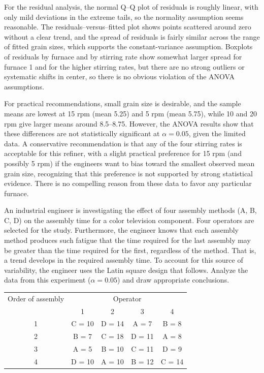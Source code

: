 \documentclass[answers,12pt,addpoints]{exam}
\begin{document}
\begin{questions}
\begin{solution}
For the residual analysis, the normal Q–Q plot of residuals is roughly linear, with only mild deviations in the extreme tails, so the normality assumption seems reasonable. The residuals–versus–fitted plot shows points scattered around zero without a clear trend, and the spread of residuals is fairly similar across the range of fitted grain sizes, which supports the constant-variance assumption. Boxplots of residuals by furnace and by stirring rate show somewhat larger spread for furnace 1 and for the higher stirring rates, but there are no strong outliers or systematic shifts in center, so there is no obvious violation of the ANOVA assumptions.

For practical recommendations, small grain size is desirable, and the sample means are lowest at 15 rpm (mean 5.25) and 5 rpm (mean 5.75), while 10 and 20 rpm give larger means around 8.5–8.75. However, the ANOVA results show that these differences are not statistically significant at $\alpha = 0.05$, given the limited data. A conservative recommendation is that any of the four stirring rates is acceptable for this refiner, with a slight practical preference for 15 rpm (and possibly 5 rpm) if the engineers want to bias toward the smallest observed mean grain size, recognizing that this preference is not supported by strong statistical evidence. There is no compelling reason from these data to favor any particular furnace.
\end{solution}

 An industrial engineer is investigating the effect of four assembly methods (A, B, C, D) on the assembly time for a color television component. Four operators are selected for the study. Furthermore, the engineer knows that each assembly method produces such fatigue that the time required for the last assembly may be greater than the time required for the first, regardless of the method. That is, a trend develops in the required assembly time. To account for this source of variability, the engineer uses the Latin square design that follows. Analyze the data from this experiment ($\alpha = 0.05$) and draw appropriate conclusions.

\begin{center}
\begin{tabular}{c|cccc}
\hline
Order of assembly & \multicolumn{4}{c}{Operator} \\
 & 1 & 2 & 3 & 4 \\
\hline
1 & C = 10 & D = 14 & A = 7 & B = 8 \\
2 & B = 7  & C = 18 & D = 11 & A = 8 \\
3 & A = 5  & B = 10 & C = 11 & D = 9 \\
4 & D = 10 & A = 10 & B = 12 & C = 14 \\
\hline
\end{tabular}
\end{center}


\end{questions}
\end{document}
